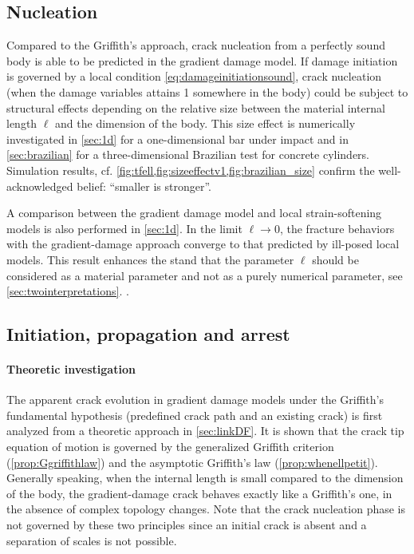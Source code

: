 \subsection{Nucleation}
Compared to the Griffith's approach, crack nucleation from a perfectly sound body is able to be predicted in the gradient damage model. If damage initiation is governed by a local condition \eqref{eq:damageinitiationsound}, crack nucleation (when the damage variables attains 1 somewhere in the body) could be subject to structural effects depending on the relative size between the material internal length $\ell$ and the dimension of the body. This size effect is numerically investigated in \cref{sec:1d} for a one-dimensional bar under impact and in \cref{sec:brazilian} for a three-dimensional Brazilian test for concrete cylinders. Simulation results, cf. \cref{fig:tfell,fig:sizeeffectv1,fig:brazilian_size} confirm the well-acknowledged belief: ``smaller is stronger''.

A comparison between the gradient damage model and local strain-softening models is also performed in \cref{sec:1d}. In the limit $\ell\to 0$, the fracture behaviors with the gradient-damage approach converge to that predicted by ill-posed local models. This result enhances the stand that the parameter $\ell$ should be considered as a material parameter and not as a purely numerical parameter, see \cref{sec:twointerpretations}. .

\subsection{Initiation, propagation and arrest}
\paragraph{Theoretic investigation} The apparent crack evolution in gradient damage models under the Griffith's fundamental hypothesis (predefined crack path and an existing crack) is first analyzed from a theoretic approach in \cref{sec:linkDF}. It is shown that the crack tip equation of motion is governed by the generalized Griffith criterion (\cref{prop:Ggriffithlaw}) and the asymptotic Griffith's law (\cref{prop:whenellpetit}). Generally speaking, when the internal length is small compared to the dimension of the body, the gradient-damage crack behaves exactly like a Griffith's one, in the absence of complex topology changes. Note that the crack nucleation phase is not governed by these two principles since an initial crack is absent and a separation of scales is not possible.


